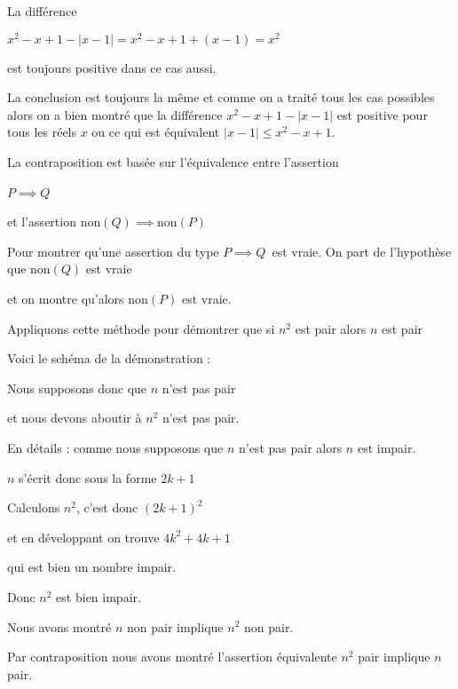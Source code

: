 La différence

 $x^2-x+1 - |x-1| = x^2-x+1 + (x-1) = x^2$

est toujours positive dans ce cas aussi.

\change

La conclusion est toujours la même et comme on a traité tous les cas possibles
alors on a bien montré que 
la différence $x^2-x+1 - |x-1|$ est positive 
pour tous les réels $x$ ou ce qui est équivalent  $|x-1| \le x^2-x+1$.


\diapo

La contraposition est basée sur l'équivalence entre 
l'assertion 

\og $P \implies Q$\fg\


et l'assertion  \og $\text{non}(Q) \implies \text{non}(P)$\fg

\change

Pour montrer qu'une assertion du type \og $P \implies Q$\fg\
est vraie. On part de l'hypothèse que $\text{non}(Q)$
est vraie 

et on montre qu'alors $\text{non}(P)$ est vraie.

\change

Appliquons cette méthode pour démontrer que si
$n^2$ est pair alors $n$ est pair



\change

Voici le schéma de la démonstration :

Nous supposons donc que $n$ n'est pas pair

\change

et nous devons aboutir à $n^2$ n'est pas pair.

\change

En détails : comme
nous supposons que $n$ n'est pas pair alors
$n$ est impair.

$n$ s'écrit donc sous la forme $2k+1$

Calculons $n^2$, c'est donc $(2k+1)^2$ 

et en développant on trouve $4k^2 + 4k + 1$

qui est bien un nombre impair.

Donc $n^2$ est bien impair.

\change

Nous avons montré $n$ non pair implique $n^2$ non pair.

Par contraposition nous avons montré l'assertion équivalente
$n^2$ pair implique $n$ pair.



